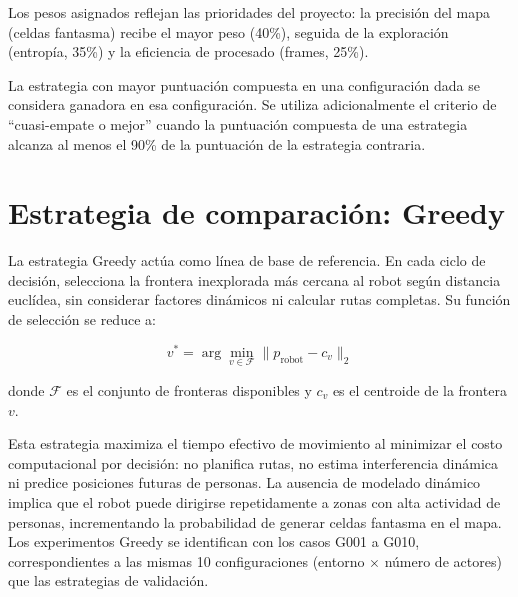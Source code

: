 \noindent Los pesos asignados reflejan las prioridades del proyecto: la precisión del mapa (celdas fantasma) recibe el mayor peso (40\%), seguida de la exploración (entropía, 35\%) y la eficiencia de procesado (frames, 25\%).

La estrategia con mayor puntuación compuesta en una configuración dada se considera ganadora en esa configuración. Se utiliza adicionalmente el criterio de ``cuasi-empate o mejor'' cuando la puntuación compuesta de una estrategia alcanza al menos el 90\% de la puntuación de la estrategia contraria.

\section{Estrategia de comparación: Greedy}

La estrategia Greedy actúa como línea de base de referencia. En cada ciclo de decisión, selecciona la frontera inexplorada más cercana al robot según distancia euclídea, sin considerar factores dinámicos ni calcular rutas completas. Su función de selección se reduce a:

\begin{equation}
    v^* = \arg\min_{v \in \mathcal{F}} \| p_{\text{robot}} - c_v \|_2
\end{equation}

\noindent donde $\mathcal{F}$ es el conjunto de fronteras disponibles y $c_v$ es el centroide de la frontera $v$.

Esta estrategia maximiza el tiempo efectivo de movimiento al minimizar el costo computacional por decisión: no planifica rutas, no estima interferencia dinámica ni predice posiciones futuras de personas. La ausencia de modelado dinámico implica que el robot puede dirigirse repetidamente a zonas con alta actividad de personas, incrementando la probabilidad de generar celdas fantasma en el mapa. Los experimentos Greedy se identifican con los casos G001 a G010, correspondientes a las mismas 10 configuraciones (entorno $\times$ número de actores) que las estrategias de validación.

